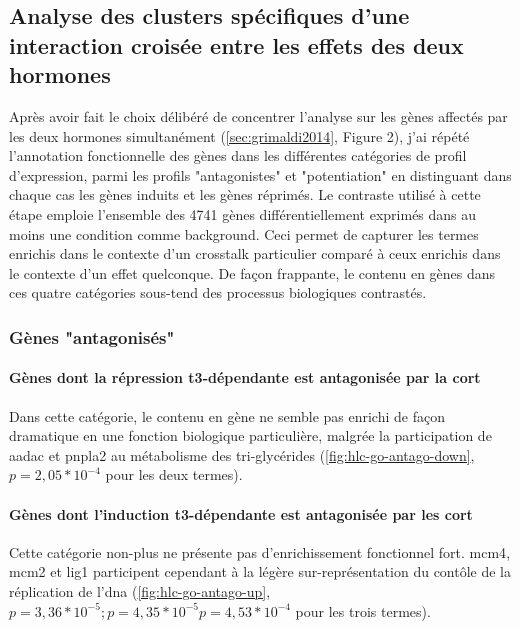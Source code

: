 \documentclass[../main.tex]{subfiles}
\begin{document}
\subsection{Analyse des clusters spécifiques d'une interaction croisée entre les effets des deux hormones}
Après avoir fait le choix délibéré de concentrer l'analyse sur les gènes affectés par les deux hormones simultanément (\autoref{sec:grimaldi2014}, Figure 2), j'ai répété l'annotation fonctionnelle des gènes dans les différentes catégories de profil d'expression, parmi les profils "antagonistes" et "potentiation" en distinguant dans chaque cas les gènes induits et les gènes réprimés.
Le contraste utilisé à cette étape emploie l'ensemble des 4741 gènes différentiellement exprimés dans au moins une condition comme background.
Ceci permet de capturer les termes enrichis dans le contexte d'un crosstalk particulier comparé à ceux enrichis dans le contexte d'un effet quelconque.
De façon frappante, le contenu en gènes dans ces quatre catégories sous-tend des processus biologiques contrastés.


\subsubsection{Gènes "antagonisés"}

\paragraph{Gènes dont la répression \gls{t3}-dépendante est antagonisée par la \gls{cort}}
Dans cette catégorie, le contenu en gène ne semble pas enrichi de façon dramatique en une fonction biologique particulière, malgrée la participation de \gls{aadac} et \gls{pnpla2} au métabolisme des tri-glycérides (\autoref{fig:hlc-go-antago-down}, $\textit{p} = 2,05 * 10^{-4}$ pour les deux termes).



\paragraph{Gènes dont l'induction \gls{t3}-dépendante est antagonisée par les \gls{cort}}
Cette catégorie non-plus ne présente pas d'enrichissement fonctionnel fort.
\gls{mcm4}, \gls{mcm2} et \gls{lig1} participent cependant à la légère sur-représentation du contôle de la réplication de l'\gls{dna} (\autoref{fig:hlc-go-antago-up}, $\textit{p}=3,36*10^{-5}; \textit{p}=4,35*10^{-5}\textit{p}=4,53*10^{-4}$ pour les trois termes).
\end{document}
